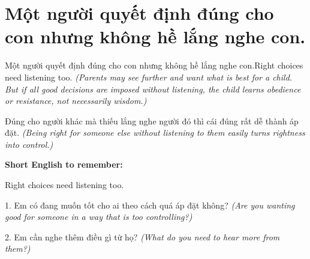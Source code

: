 \section{Một người quyết định đúng cho con nhưng không hề lắng nghe con.}
\begin{truyen}{Một người quyết định đúng cho con nhưng không hề lắng nghe con.}{Right choices need listening too.}
\textit{(Parents may see further and want what is best for a child. But if all good decisions are imposed without listening, the child learns obedience or resistance, not necessarily wisdom.)}
\end{truyen}
\begin{baihoc}
Đúng cho người khác mà thiếu lắng nghe người đó thì cái đúng rất dễ thành áp đặt.
\textit{(Being right for someone else without listening to them easily turns rightness into control.)}
\end{baihoc}
\begin{ghinhoanh}\textbf{Short English to remember:}

Right choices need listening too.
\end{ghinhoanh}
\begin{tuhocnhanh}
1. Em có đang muốn tốt cho ai theo cách quá áp đặt không? \textit{(Are you wanting good for someone in a way that is too controlling?)}

2. Em cần nghe thêm điều gì từ họ? \textit{(What do you need to hear more from them?)}
\end{tuhocnhanh}
\ngancach